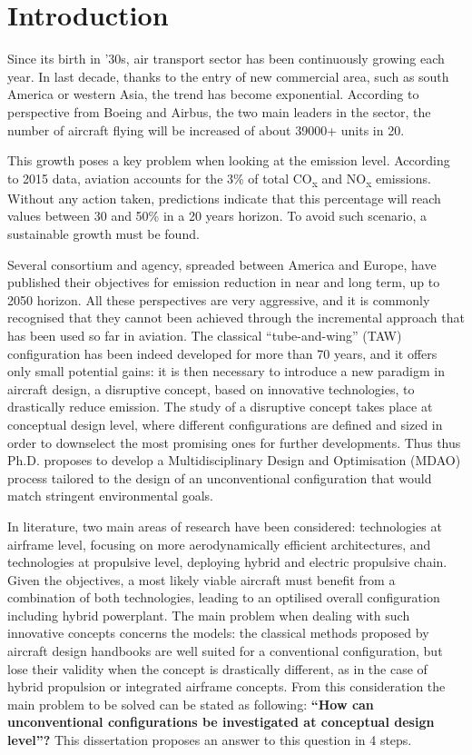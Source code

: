 \chapter*{Introduction}
\mtcaddchapter 

Since its birth in '30s, air transport sector has been continuously growing each year. 
In last decade, thanks to the entry of new commercial area, such as south America or western Asia, the trend has become exponential. 
According to perspective from Boeing and Airbus, the two main leaders in the sector, the number of aircraft flying will be increased of about 39000+ units in 20.

This growth poses a key problem when looking at the emission level.
According to 2015 data, aviation accounts for the 3\% of total CO\textsubscript{x} and NO\textsubscript{x} emissions.
Without any action taken, predictions indicate that this percentage will reach values between 30 and 50\% in a 20 years horizon. 
To avoid such scenario, a sustainable growth must be found. 

Several consortium and agency, spreaded between America and Europe, have published their objectives for emission reduction in near and long term, up to 2050 horizon. 
All these perspectives are very aggressive, and it is commonly recognised that they cannot been achieved through the incremental approach that has been used so far in aviation. 
The classical ``tube-and-wing'' (TAW) configuration has been indeed developed for more than 70 years, and it offers only small potential gains: it is then necessary to introduce a new paradigm in aircraft design, a disruptive concept, based on innovative technologies, to drastically reduce emission. 
The study of a disruptive concept takes place at conceptual design level, where different configurations are defined and sized in order to downselect the most promising ones for further developments. 
Thus thus Ph.D. proposes to develop a Multidisciplinary Design and Optimisation (MDAO) process tailored to the design of an unconventional configuration that would match stringent environmental goals. 

In literature, two main areas of research have been considered: technologies at airframe level, focusing on more aerodynamically efficient architectures, and technologies at propulsive level, deploying hybrid and electric propulsive chain. 
Given the objectives, a most likely viable aircraft must benefit from a combination of both technologies, leading to an optilised overall configuration including hybrid powerplant. 
The main problem when dealing with such innovative concepts concerns the models: the classical methods proposed by aircraft design handbooks are well suited for a conventional configuration, but lose their validity when the concept is drastically different, as in the case of hybrid propulsion or integrated airframe concepts. 
From this consideration the main problem to be solved can be stated as following: \textbf{``How can unconventional configurations be investigated at conceptual design level''?}
This dissertation proposes an answer to this question in 4 steps.

